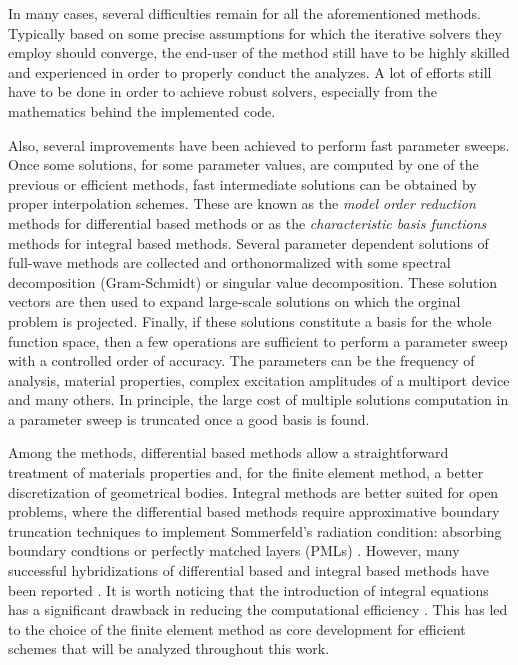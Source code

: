 In many cases, several difficulties remain for all the aforementioned methods. Typically based on some precise assumptions for which the iterative solvers they employ should converge, the end-user of the method still have to be highly skilled and experienced in order to properly conduct the analyzes. A lot of efforts still have to be done in order to achieve robust solvers, especially from the mathematics behind the implemented code.

Also, several improvements have been achieved to perform fast parameter sweeps. Once some solutions, for some parameter values, are computed by one of the previous  or efficient methods, fast intermediate solutions can be obtained by proper interpolation schemes. These are known as the \textit{model order reduction} methods \cite{farle2006multivariate, ntibarikure2012model} for differential based methods or as the \textit{characteristic basis functions} methods \cite{prakash2003characteristic} for integral based methods. Several parameter dependent solutions of full-wave methods are collected and orthonormalized with some spectral decomposition (Gram-Schmidt) or singular value decomposition. These solution vectors are then used to expand large-scale solutions on which the orginal problem is projected. Finally, if these solutions constitute a basis for the whole function space, then a few operations are sufficient to perform a parameter sweep with a controlled order of accuracy. The parameters can be the frequency of analysis, material properties, complex excitation amplitudes of a multiport device and many others. In principle, the large cost of multiple solutions computation in a parameter sweep is truncated once a good basis is found.

Among the  methods, differential based methods allow a straightforward treatment of materials properties and, for the finite element method, a better discretization of geometrical bodies. Integral methods are better suited for open problems, where the differential based methods require approximative boundary truncation techniques to implement Sommerfeld's radiation condition: absorbing boundary condtions \cite{Bayliss1982, Silvester1988} or perfectly matched layers (PMLs) \cite{Berenger1994}. However, many successful hybridizations of differential based and integral based methods have been reported \cite{xu1997hybrid, zhao2011efficient}. It is worth noticing that the introduction of integral equations has a significant drawback in reducing the computational efficiency \cite{zhao2006solving}. This has led to the choice of the finite element method as core development for efficient schemes that will be analyzed throughout this work.

